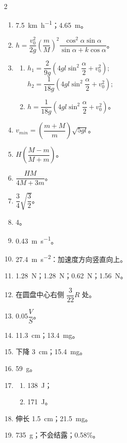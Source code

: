 \begin{fullwidth}
\begin{multicols}{2}
\begin{enumerate}[label=\arabic*.]
\item \SI[per-mode=symbol]{7.5}{\kilo\metre\per\hour}；\SI{4.65}{\metre}。
\item $h = \dfrac{v_{0}^{2}}{2g} \left( \dfrac{m}{M}\right)^{2} \dfrac{\cos^{2} \alpha \sin \alpha}{\sin \alpha + k \cos \alpha}$。
\item
\begin{enumerate}[label=(\arabic*)]
\item $h_{1} = \dfrac{2}{9g} \left( 4gl \sin^{2} \dfrac{\alpha}{2} + v_{0}^{2}\right);$\\
$h_{2} = \dfrac{1}{18g} \left( 4gl \sin^{2} \dfrac{\alpha}{2} + v_{0}^{2}\right);$
\item $h = \dfrac{1}{18g} \left( 4gl \sin^{2} \dfrac{\alpha}{2} + v_{0}^{2}\right)$。
\end{enumerate}
\item $v_{min} = \left( \dfrac{m+M}{m} \right) \sqrt{5gl}$。
\item $H \left( \dfrac{M-m}{M+m} \right)$。
\item $\dfrac{HM}{4M+3m}$。
\item $\dfrac{3}{4} \sqrt{\dfrac{3}{2}}$。
\item 4。
\item \SI[per-mode=symbol]{0.43}{\metre\per\second}。
\item \SI[per-mode=symbol]{27.4}{\metre\per\second\squared}：加速度方向竖直向上。
\item \SI{1.28}{\newton}；\SI{1.28}{\newton}；\SI{0.62}{\newton}；\SI{1.56}{\newton}。
\item 在圆盘中心右侧 $\dfrac{3}{22}R$ 处。
\item $0.05 \dfrac{V}{S}$。
\item \SI{11.3}{\centi\metre}；\SI{13.4}{\milli\gram}。
\item 下降 \SI{3}{\centi\metre}；\SI{15.4}{\milli\gram}。
\item \SI{59}{\gram}。
\item
\begin{enumerate}[label=(\arabic*)]
\item \SI{138}{\joule}；
\item  \SI{171}{\joule}。
\end{enumerate}
\item 伸长 \SI{1.5}{\centi\metre}；\SI{21.5}{\milli\gram}。
\item \SI{735}{\gram}；不会结露；0.58\%。

\end{enumerate}
\end{multicols}
\end{fullwidth}
